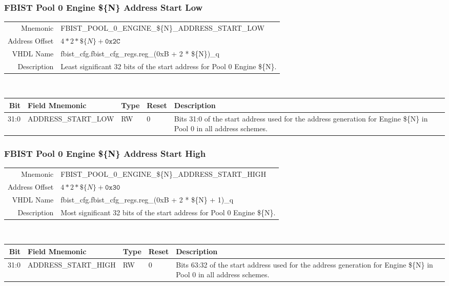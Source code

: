 \subsubsection{FBIST Pool 0 Engine \$\{N\} Address Start Low}
\begin{tabular}{ r | p{350px} }
  Mnemonic       & FBIST\_POOL\_0\_ENGINE\_\$\{N\}\_ADDRESS\_START\_LOW     \\
  Address Offset & $4 * 2 * \$\{N\} + \texttt{0x2C}$                        \\
  VHDL Name      &  fbist\_cfg.fbist\_cfg\_regs.reg\_(0xB + 2 * \$\{N\})\_q \\ \hline

  Description &
  Least significant 32 bits of the start address for Pool 0 Engine \$\{N\}. \\
\end{tabular}
\\
\begin{tabularx}{\textwidth}{r|l|l|l|X}
  \hline
  Bit   & Field Mnemonic      & Type & Reset & Description \\ \hline

  31:0  & ADDRESS\_START\_LOW & RW   & 0     &

  Bits 31:0 of the start address used for the address generation for
  Engine \$\{N\} in Pool 0 in all address schemes. \\
\end{tabularx}

\subsubsection{FBIST Pool 0 Engine \$\{N\} Address Start High}
\begin{tabular}{ r | p{350px} }
  Mnemonic       & FBIST\_POOL\_0\_ENGINE\_\$\{N\}\_ADDRESS\_START\_HIGH        \\
  Address Offset & $4 * 2 * \$\{N\} + \texttt{0x30}$                            \\
  VHDL Name      &  fbist\_cfg.fbist\_cfg\_regs.reg\_(0xB + 2 * \$\{N\} + 1)\_q \\ \hline

  Description &
  Most significant 32 bits of the start address for Pool 0 Engine \$\{N\}. \\
\end{tabular}
\\
\begin{tabularx}{\textwidth}{r|l|l|l|X}
  \hline
  Bit   & Field Mnemonic       & Type & Reset & Description \\ \hline

  31:0  & ADDRESS\_START\_HIGH & RW   & 0     &

  Bits 63:32 of the start address used for the address generation for
  Engine \$\{N\} in Pool 0 in all address schemes. \\
\end{tabularx}

